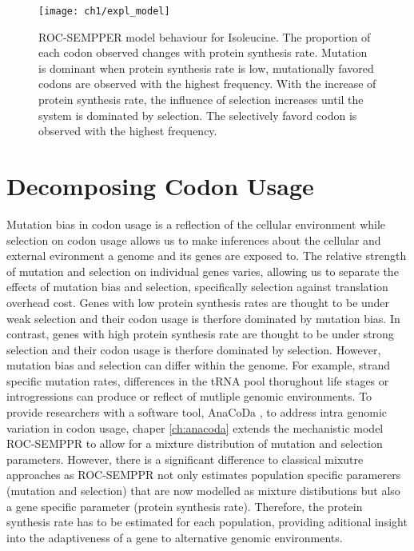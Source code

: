 \begin{figure}[H]
     \centering
	\texttt{[image: ch1/expl\_model]}
	\caption{ROC-SEMPPER model behaviour for Isoleucine.
	The proportion of each codon observed changes with protein synthesis rate.
	Mutation is dominant when protein synthesis rate is low, mutationally favored codons are observed with the highest frequency.
	With the increase of protein synthesis rate, the influence of selection increases until the system is dominated by selection.
	The selectively favord codon is observed with the highest frequency.}
	\label{fig:expl_model}
\end{figure}

\section{Decomposing Codon Usage}

Mutation bias in codon usage is a reflection of the cellular environment while selection on codon usage allows us to make inferences about the cellular and external evironment a genome and its genes are exposed to.
The relative strength of mutation and selection on individual genes varies, allowing us to separate the effects of mutation bias and selection, specifically selection against translation overhead cost.
Genes with low protein synthesis rates are thought to be under weak selection and their codon usage is therfore dominated by mutation bias.
In contrast, genes with high protein synthesis rate are thought to be under strong selection and their codon usage is therfore dominated by selection.
However, mutation bias and selection can differ within the genome.
For example, strand specific mutation rates, differences in the tRNA pool thorughout life stages or introgressions can produce or reflect of mutliple genomic environments.
To provide researchers with a software tool, AnaCoDa \cite{landerer2018}, to address intra genomic variation in codon usage, chaper \ref{ch:anacoda} extends the mechanistic model ROC-SEMPPR \cite{gilchrist2015} to allow for a mixture distribution of mutation and selection parameters.
However, there is a significant difference to classical mixutre approaches as ROC-SEMPPR not only estimates population specific paramerers (mutation and selection) that are now modelled as mixture distibutions but also a gene specific parameter (protein synthesis rate). 
Therefore, the protein synthesis rate has to be estimated for each population, providing aditional insight into the adaptiveness of a gene to alternative genomic environments.


